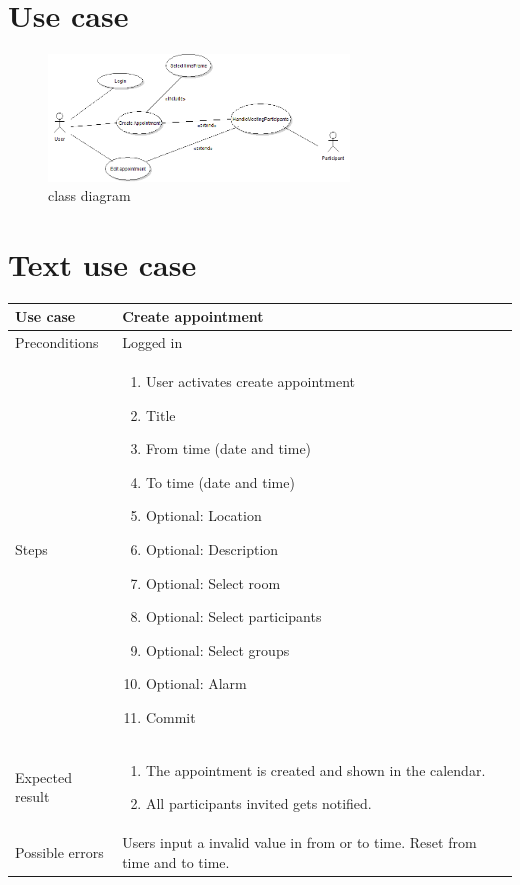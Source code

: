\documentclass[a4paper, 10pt]{article}
\begin{document}
\section{Use case}
\begin{figure}[h!] 
    \begin{center}  
        \includegraphics[width=8cm]{img/useCase1-4.png}
        \caption{class diagram}
    \label{class}
    \end{center}
\end{figure}


\section{Text use case}
\begin{tabularx}{\textwidth}{ |X|X| }
\hline
\rowcolor{Gray}
Use case &  Create appointment \\ \hline
Preconditions & Logged in \\ \hline
Steps & 
\begin{enumerate}
	\item User activates create appointment
	\item Title
	\item From time (date and time)
	\item To time (date and time)
	\item Optional: Location
	\item Optional: Description
	\item Optional: Select room
	\item Optional: Select participants
	\item Optional: Select groups
	\item Optional: Alarm
	\item Commit
\end{enumerate}\\ \hline
Expected result & 
\begin{enumerate}
	\item The appointment is created and shown in the calendar.
	\item All participants invited gets notified. 
\end{enumerate} \\ \hline
Possible errors & Users input a invalid value in from or to time. Reset from time and to time. \\ \hline


\end{tabularx}
\end{document}
